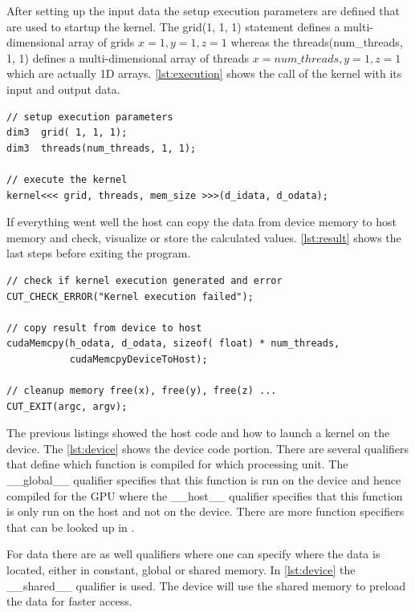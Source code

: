 After setting up the input data the setup execution parameters are defined that
are used to startup the kernel. The \textsf{grid(1, 1, 1)} statement defines
a multi-dimensional array of grids $x=1, y=1, z=1$ whereas the
\textsf{threads(num\_threads, 1, 1)} defines a multi-dimensional array of
threads $x=num\_threads, y=1, z=1$ which are actually \gls{1D} arrays.
\autoref{lst:execution} shows the call of the kernel with its input and
output data.


\begin{lstlisting}[caption=Execution of the Kernel, label=lst:execution]
// setup execution parameters
dim3  grid( 1, 1, 1);
dim3  threads(num_threads, 1, 1);

// execute the kernel
kernel<<< grid, threads, mem_size >>>(d_idata, d_odata);
\end{lstlisting} 

If everything went well the host can copy the data from device memory
to host memory and check, visualize or store the calculated values.
\autoref{lst:result} shows the last steps before exiting the program.

\begin{lstlisting}[caption=Retrieving of the Results, label=lst:result]
// check if kernel execution generated and error
CUT_CHECK_ERROR("Kernel execution failed");
 
// copy result from device to host
cudaMemcpy(h_odata, d_odata, sizeof( float) * num_threads, 
           cudaMemcpyDeviceToHost);

// cleanup memory free(x), free(y), free(z) ...
CUT_EXIT(argc, argv);
\end{lstlisting} 

The previous listings showed the host code and how to launch a kernel on the
device. The \autoref{lst:device} shows the device code portion. There are
several qualifiers that define which function is compiled for which processing
unit. The \textsf{\_\_global\_\_} qualifier specifies that this function is run
on the device and hence compiled for the \gls{GPU} where the
\textsf{\_\_host\_\_} qualifier specifies that this function is only run on the
host and not on the device. There are more function specifiers that can be
looked up in \citep{citeulike:3325943}.

For data there are as well qualifiers where one can specify where the data is
located, either in constant, global or shared memory. In \autoref{lst:device}
the \textsf{\_\_shared\_\_} qualifier is used. The device will use the shared
memory to preload the data for faster access.

